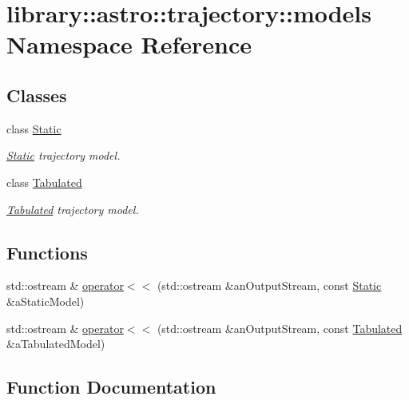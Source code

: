 \hypertarget{namespacelibrary_1_1astro_1_1trajectory_1_1models}{}\section{library\+:\+:astro\+:\+:trajectory\+:\+:models Namespace Reference}
\label{namespacelibrary_1_1astro_1_1trajectory_1_1models}
\subsection*{Classes}
\begin{DoxyCompactItemize}
\item 
class \hyperlink{classlibrary_1_1astro_1_1trajectory_1_1models_1_1_static}{Static}
\begin{DoxyCompactList}\small\item\em \hyperlink{classlibrary_1_1astro_1_1trajectory_1_1models_1_1_static}{Static} trajectory model. \end{DoxyCompactList}\item 
class \hyperlink{classlibrary_1_1astro_1_1trajectory_1_1models_1_1_tabulated}{Tabulated}
\begin{DoxyCompactList}\small\item\em \hyperlink{classlibrary_1_1astro_1_1trajectory_1_1models_1_1_tabulated}{Tabulated} trajectory model. \end{DoxyCompactList}\end{DoxyCompactItemize}
\subsection*{Functions}
\begin{DoxyCompactItemize}
\item 
std\+::ostream \& \hyperlink{namespacelibrary_1_1astro_1_1trajectory_1_1models_a38b84fcfa01f86bfe41978e3f6228e09}{operator$<$$<$} (std\+::ostream \&an\+Output\+Stream, const \hyperlink{classlibrary_1_1astro_1_1trajectory_1_1models_1_1_static}{Static} \&a\+Static\+Model)
\item 
std\+::ostream \& \hyperlink{namespacelibrary_1_1astro_1_1trajectory_1_1models_abeeeb7b255bbca2ab8e9d0e64966cfaf}{operator$<$$<$} (std\+::ostream \&an\+Output\+Stream, const \hyperlink{classlibrary_1_1astro_1_1trajectory_1_1models_1_1_tabulated}{Tabulated} \&a\+Tabulated\+Model)
\end{DoxyCompactItemize}


\subsection{Function Documentation}
\mbox{\label{namespacelibrary_1_1astro_1_1trajectory_1_1models_a38b84fcfa01f86bfe41978e3f6228e09}} 
